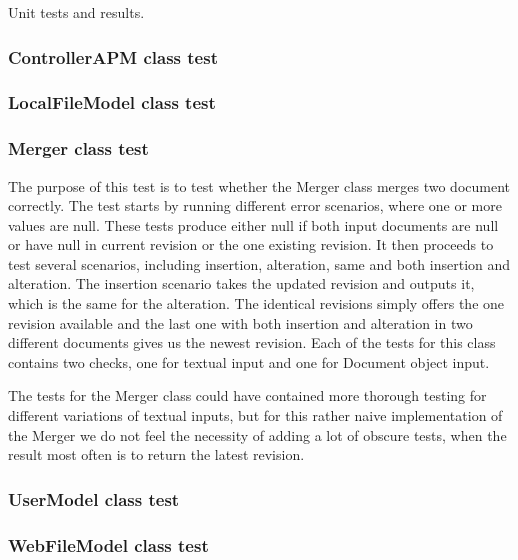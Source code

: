 Unit tests and results.

\subsubsection{ControllerAPM class test}

\subsubsection{LocalFileModel class test}

\subsubsection{Merger class test}
The purpose of this test is to test whether the Merger class merges two document correctly. The test starts by running different error scenarios, where one or more values are null. These tests produce either null if both input documents are null or have null in current revision or the one existing revision.
It then proceeds to test several scenarios, including insertion, alteration, same and both insertion and alteration. The insertion scenario takes the updated revision and outputs it, which is the same for the alteration. The identical revisions simply offers the one revision available and the last one with both insertion and alteration in two different documents gives us the newest revision. Each of the tests for this class contains two checks, one for textual input and one for Document object input.

The tests for the Merger class could have contained more thorough testing for different variations of textual inputs, but for this rather naive implementation of the Merger we do not feel the necessity of adding a lot of obscure tests, when the result most often is to return the latest revision.

\subsubsection{UserModel class test}

\subsubsection{WebFileModel class test}